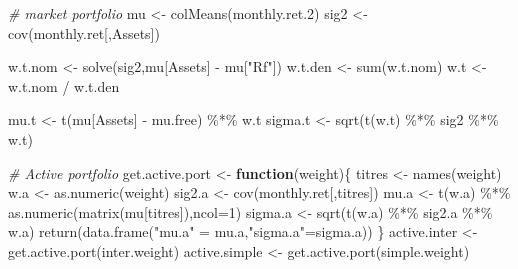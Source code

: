 \documentclass[
]{article}
\newenvironment{Shaded}{\begin{snugshade}}{\end{snugshade}}
\newcommand{\AttributeTok}[1]{\textcolor[rgb]{0.77,0.63,0.00}{#1}}
\newcommand{\CommentTok}[1]{\textcolor[rgb]{0.56,0.35,0.01}{\textit{#1}}}
\newcommand{\ControlFlowTok}[1]{\textcolor[rgb]{0.13,0.29,0.53}{\textbf{#1}}}
\newcommand{\DecValTok}[1]{\textcolor[rgb]{0.00,0.00,0.81}{#1}}
\newcommand{\FloatTok}[1]{\textcolor[rgb]{0.00,0.00,0.81}{#1}}
\newcommand{\FunctionTok}[1]{\textcolor[rgb]{0.00,0.00,0.00}{#1}}
\newcommand{\NormalTok}[1]{#1}
\newcommand{\OtherTok}[1]{\textcolor[rgb]{0.56,0.35,0.01}{#1}}
\newcommand{\SpecialCharTok}[1]{\textcolor[rgb]{0.00,0.00,0.00}{#1}}
\newcommand{\StringTok}[1]{\textcolor[rgb]{0.31,0.60,0.02}{#1}}
\begin{document}
\begin{Shaded}
\begin{Highlighting}[]
\CommentTok{\# market portfolio}
\NormalTok{mu }\OtherTok{\textless{}{-}} \FunctionTok{colMeans}\NormalTok{(monthly.ret}\FloatTok{.2}\NormalTok{)}
\NormalTok{sig2 }\OtherTok{\textless{}{-}} \FunctionTok{cov}\NormalTok{(monthly.ret[,Assets])}

\NormalTok{w.t.nom }\OtherTok{\textless{}{-}} \FunctionTok{solve}\NormalTok{(sig2,mu[Assets] }\SpecialCharTok{{-}}\NormalTok{ mu[}\StringTok{"Rf"}\NormalTok{])}
\NormalTok{w.t.den }\OtherTok{\textless{}{-}} \FunctionTok{sum}\NormalTok{(w.t.nom)}
\NormalTok{w.t }\OtherTok{\textless{}{-}}\NormalTok{ w.t.nom }\SpecialCharTok{/}\NormalTok{ w.t.den}

\NormalTok{mu.t }\OtherTok{\textless{}{-}} \FunctionTok{t}\NormalTok{(mu[Assets] }\SpecialCharTok{{-}}\NormalTok{ mu.free) }\SpecialCharTok{\%*\%}\NormalTok{ w.t}
\NormalTok{sigma.t }\OtherTok{\textless{}{-}} \FunctionTok{sqrt}\NormalTok{(}\FunctionTok{t}\NormalTok{(w.t) }\SpecialCharTok{\%*\%}\NormalTok{ sig2 }\SpecialCharTok{\%*\%}\NormalTok{ w.t)}
\end{Highlighting}
\end{Shaded}

\begin{Shaded}
\begin{Highlighting}[]
\CommentTok{\# Active portfolio}
\NormalTok{get.active.port }\OtherTok{\textless{}{-}} \ControlFlowTok{function}\NormalTok{(weight)\{}
\NormalTok{  titres }\OtherTok{\textless{}{-}} \FunctionTok{names}\NormalTok{(weight)}
\NormalTok{  w.a }\OtherTok{\textless{}{-}} \FunctionTok{as.numeric}\NormalTok{(weight)}
\NormalTok{  sig2.a }\OtherTok{\textless{}{-}} \FunctionTok{cov}\NormalTok{(monthly.ret[,titres])}
\NormalTok{  mu.a }\OtherTok{\textless{}{-}} \FunctionTok{t}\NormalTok{(w.a) }\SpecialCharTok{\%*\%} \FunctionTok{as.numeric}\NormalTok{(}\FunctionTok{matrix}\NormalTok{(mu[titres]),}\AttributeTok{ncol=}\DecValTok{1}\NormalTok{)}
\NormalTok{  sigma.a }\OtherTok{\textless{}{-}} \FunctionTok{sqrt}\NormalTok{(}\FunctionTok{t}\NormalTok{(w.a) }\SpecialCharTok{\%*\%}\NormalTok{ sig2.a }\SpecialCharTok{\%*\%}\NormalTok{ w.a)}
  \FunctionTok{return}\NormalTok{(}\FunctionTok{data.frame}\NormalTok{(}\StringTok{"mu.a"} \OtherTok{=}\NormalTok{ mu.a,}\StringTok{"sigma.a"}\OtherTok{=}\NormalTok{sigma.a))}
\NormalTok{\}}
\NormalTok{active.inter }\OtherTok{\textless{}{-}} \FunctionTok{get.active.port}\NormalTok{(inter.weight)}
\NormalTok{active.simple }\OtherTok{\textless{}{-}} \FunctionTok{get.active.port}\NormalTok{(simple.weight)}
\end{Highlighting}
\end{Shaded}
\end{document}

